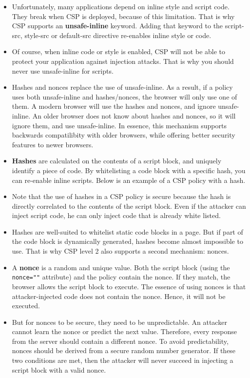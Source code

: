 \documentclass[../main.tex]{subfiles}
\begin{document}
\begin{itemize}
\item Unfortunately, many applications depend on inline style and script code. They break when CSP is deployed, because of this limitation. That is why CSP supports an \textbf{unsafe-inline} keyword. Adding that keyword to the script-src, style-src or default-src directive re-enables inline style or code.
\item Of course, when inline code or style is enabled, CSP will not be able to protect your application against injection attacks. That is why you should never use unsafe-inline for scripts.
\item Hashes and nonces replace the use of unsafe-inline. As a result, if a policy uses both unsafe-inline and hashes/nonces, the browser will only use one of them. A modern browser will use the hashes and nonces, and ignore unsafe-inline. An older browser does not know about hashes and nonces, so it will ignore them, and use unsafe-inline. In essence, this mechanism supports backwards compatilibity with older browsers, while offering better security features to newer browsers.
\item \textbf{Hashes} are calculated on the contents of a script block, and uniquely identify a piece of code. By whitelisting a code block with a specific hash, you can re-enable inline scripts. Below is an example of a CSP policy with a hash.
\item Note that the use of hashes in a CSP policy is secure because the hash is directly correlated to the contents of the script block. Even if the attacker can inject script code, he can only inject code that is already white listed.
\item Hashes are well-suited to whitelist static code blocks in a page. But if part of the code block is dynamically generated, hashes become almost impossible to use. That is why CSP level 2 also supports a second mechanism: nonces.
\item A \textbf{nonce} is a random and unique value. Both the script block (using the \texttt{nonce=""} attribute) and the policy contain the nonce. If they match, the browser allows the script block to execute. The essence of using nonces is that attacker-injected code does not contain the nonce. Hence, it will not be executed.
\item But for nonces to be secure, they need to be unpredictable. An attacker cannot learn the nonce or predict the next value. Therefore, every response from the server should contain a different nonce. To avoid predictability, nonces should be derived from a secure random number generator. If these two conditions are met, then the attacker will never succeed in injecting a script block with a valid nonce.

\end{itemize}
\end{document}
